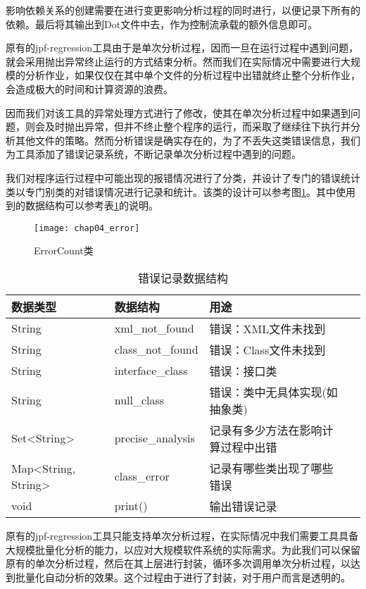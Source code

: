 影响依赖关系的创建需要在进行变更影响分析过程的同时进行，以便记录下所有的依赖。最后将其输出到Dot文件中去，作为控制流承载的额外信息即可。

原有的jpf-regression工具由于是单次分析过程，因而一旦在运行过程中遇到问题，就会采用抛出异常终止运行的方式结束分析。然而我们在实际情况中需要进行大规模的分析作业，如果仅仅在其中单个文件的分析过程中出错就终止整个分析作业，会造成极大的时间和计算资源的浪费。

因而我们对该工具的异常处理方式进行了修改，使其在单次分析过程中如果遇到问题，则会及时抛出异常，但并不终止整个程序的运行，而采取了继续往下执行并分析其他文件的策略。然而分析错误是确实存在的，为了不丢失这类错误信息，我们为工具添加了错误记录系统，不断记录单次分析过程中遇到的问题。

我们对程序运行过程中可能出现的报错情况进行了分类，并设计了专门的错误统计类以专门别类的对错误情况进行记录和统计。该类的设计可以参考图\ref {class_error}。其中使用到的数据结构可以参考表\ref {error_data}的说明。

\begin{figure}[H]
	\centering
	\texttt{[image: chap04\_error]}
	\caption {ErrorCount类}
	\label {class_error}	
\end{figure}

\begin{table}
	\caption{错误记录数据结构}
	\label{error_data}
	\centering
	\begin{tabular}{lllc}
		\toprule[1.5pt]
		{\heiti 数据类型} &{\heiti 数据结构} & {\heiti 用途} \\\midrule[1pt]
		String & xml\_not\_found & 错误：XML文件未找到 \\
		String & class\_not\_found & 错误：Class文件未找到 \\
		String & interface\_class &  错误：接口类\\
		String & null\_class & 错误：类中无具体实现(如抽象类)\\
		Set<String> & precise\_analysis & 记录有多少方法在影响计算过程中出错\\
		Map<String, String> & class\_error & 记录有哪些类出现了哪些错误\\
		void & print() & 输出错误记录\\
		\bottomrule[1.5pt]
	\end{tabular}
\end{table}



原有的jpf-regression工具只能支持单次分析过程，在实际情况中我们需要工具具备大规模批量化分析的能力，以应对大规模软件系统的实际需求。为此我们可以保留原有的单次分析过程，然后在其上层进行封装，循环多次调用单次分析过程，以达到批量化自动分析的效果。这个过程由于进行了封装，对于用户而言是透明的。

